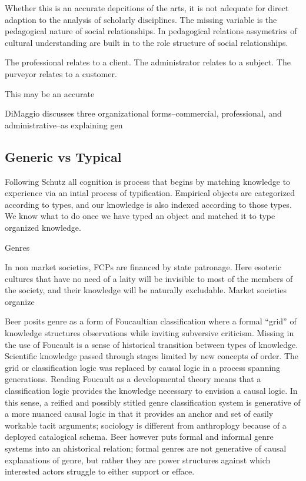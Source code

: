 \documentclass[]{book}
\theoremstyle{definition}
\theoremstyle{definition}
\theoremstyle{definition}
\theoremstyle{remark}
\begin{document}
Whether this is an accurate depcitions of the arts, it is not adequate
for direct adaption to the analysis of scholarly disciplines. The
missing variable is the pedagogical nature of social relationships. In
pedagogical relations assymetries of cultural understanding are built in
to the role structure of social relationships.

The professional relates to a client. The administrator relates to a
subject. The purveyor relates to a customer.

This may be an accurate

DiMaggio discusses three organizational forms--commercial, professional,
and administrative--as explaining gen

\hypertarget{generic-vs-typical}{%
\subsection{Generic vs Typical}\label{generic-vs-typical}}

Following Schutz all cognition is process that begins by matching
knowledge to experience via an intial process of typification. Empirical
objects are categorized according to types, and our knowledge is also
indexed according to those types. We know what to do once we have typed
an object and matched it to type organized knowledge.

Genres

In non market societies, FCPs are financed by state patronage. Here
esoteric cultures that have no need of a laity will be invisible to most
of the members of the society, and their knowledge will be naturally
excludable. Market societies organize

\citet{Schutz1970Reflections}

Beer \citeyearpar{Beer2013Genre} posits genre as a form of Foucaultian
classification where a formal ``grid'' of knowledge structures
observations while inviting subversive criticism. Missing in the use of
Foucault is a sense of historical transition between types of knowledge.
Scientific knowledge passed through stages limited by new concepts of
order. The grid or classification logic was replaced by causal logic in
a process spanning generations. \citep[150]{Foucault2002order} Reading
Foucault as a developmental theory means that a classification logic
provides the knowledge necessary to envision a causal logic. In this
sense, a reified and possibly stitled genre classification system is
generative of a more nuanced causal logic in that it provides an anchor
and set of easily workable tacit arguments; sociology is different from
anthroplogy because of a deployed catalogical schema. Beer however puts
formal and informal genre systems into an ahistorical relation; formal
genres are not generative of causal explanations of genre, but rather
they are power structures against which interested actors struggle to
either support or efface.
\end{document}

